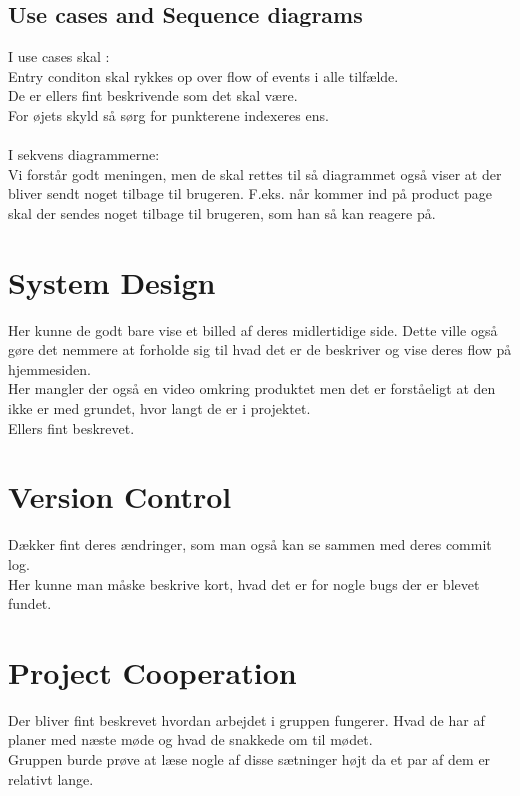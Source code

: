 \documentclass[a4paper]{article}
\begin{document}
\subsection*{Use cases and Sequence diagrams}
I use cases skal :\\
Entry conditon skal rykkes op over flow of events i alle tilfælde.\\
De er ellers fint beskrivende som det skal være.\\ For øjets skyld så sørg for punkterene indexeres ens. \\ \\
I sekvens diagrammerne: \\
Vi forstår godt meningen, men de skal rettes til så diagrammet også viser at der bliver sendt noget tilbage til brugeren. F.eks. når kommer ind på product page skal der sendes noget tilbage til brugeren, som han så kan reagere på.\
\section*{System Design}
Her kunne de godt bare vise et billed af deres midlertidige side. Dette ville også gøre det nemmere at forholde sig til hvad det er de beskriver og vise deres flow på hjemmesiden.\\
Her mangler der også en video omkring produktet men det er forståeligt at den ikke er med grundet, hvor langt de er i projektet.\\
Ellers fint beskrevet.\\ 

\section*{Version Control}
Dækker fint deres ændringer, som man også kan se sammen med deres commit log.\\ Her kunne man måske beskrive kort, hvad det er for nogle bugs der er blevet fundet.
\section*{Project Cooperation}
Der bliver fint beskrevet hvordan arbejdet i gruppen fungerer. Hvad de har af planer med næste møde og hvad de snakkede om til mødet.\\  
Gruppen burde prøve at læse nogle af disse sætninger højt da et par af dem er relativt lange.\\
\end{document}
